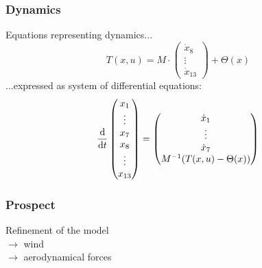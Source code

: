 	\begin{frame}
		\frametitle{Dynamics}
		Equations representing dynamics...
		\[ T(x, u) = M \cdot \begin{pmatrix} \dot{x}_{8} \\ \vdots \\ \dot{x}_{13} \end{pmatrix} + \Theta(x) \]
		\onslide<2->
		...expressed as system of differential equations:
		\[ \frac{\textup{d}}{\textup{d}t} 
			\begin{pmatrix}
						  x_{1} \\ \vdots \\ x_{7} \\ x_{8} \\ \vdots \\ x_{13}
			\end{pmatrix}
			=
			\begin{pmatrix}
							\dot{x}_{1} \\ \vdots \\ \dot{x}_{7} \\ M^{-1}(T(x,u)-\Theta(x))
			\end{pmatrix}
		\]
	\end{frame}
	
	\begin{frame}
		\frametitle{Prospect}
			Refinement of the model \\
			\vspace{1ex}
			\(\rightarrow\) wind \\
			\vspace{1ex}
			\(\rightarrow\) aerodynamical forces \\
	\end{frame}

%
